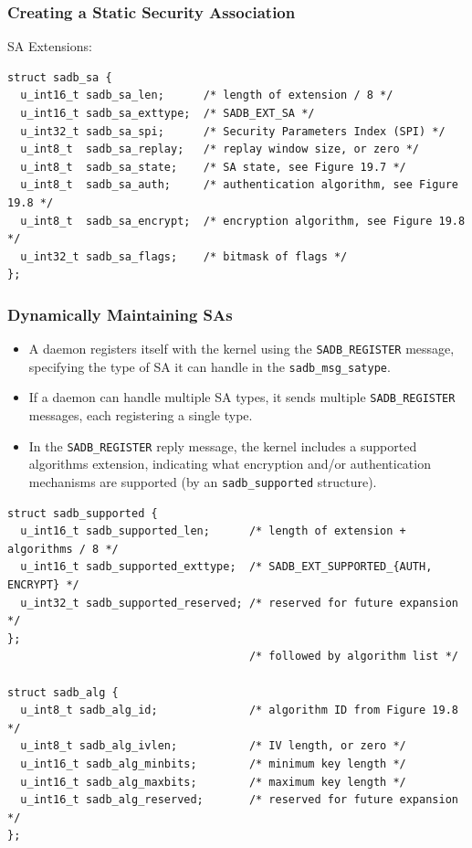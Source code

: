 \documentclass[notes,serif]{beamer}
\begin{document}
\begin{frame}[containsverbatim]
  \frametitle{Creating a Static Security Association}
  SA Extensions:
  {\scriptsize
  \begin{verbatim}
struct sadb_sa {
  u_int16_t sadb_sa_len;      /* length of extension / 8 */
  u_int16_t sadb_sa_exttype;  /* SADB_EXT_SA */
  u_int32_t sadb_sa_spi;      /* Security Parameters Index (SPI) */
  u_int8_t  sadb_sa_replay;   /* replay window size, or zero */
  u_int8_t  sadb_sa_state;    /* SA state, see Figure 19.7 */
  u_int8_t  sadb_sa_auth;     /* authentication algorithm, see Figure 19.8 */
  u_int8_t  sadb_sa_encrypt;  /* encryption algorithm, see Figure 19.8 */
  u_int32_t sadb_sa_flags;    /* bitmask of flags */
};
  \end{verbatim}
  }
\end{frame}

\begin{frame}[containsverbatim]
  \frametitle{Dynamically Maintaining SAs}
  {\scriptsize
  \begin{itemize}
    \item A daemon registers itself with the kernel using the \texttt{SADB\_REGISTER} message, specifying the type of SA it can handle in the \texttt{sadb\_msg\_satype}.
    \item If a daemon can handle multiple SA types, it sends multiple \texttt{SADB\_REGISTER} messages, each registering a single type.
    \item In the \texttt{SADB\_REGISTER} reply message, the kernel includes a supported algorithms extension, indicating what encryption and/or authentication mechanisms are supported (by an \texttt{sadb\_supported} structure).
  \end{itemize}
  }
  {\tiny
  \begin{verbatim}
struct sadb_supported {
  u_int16_t sadb_supported_len;      /* length of extension + algorithms / 8 */
  u_int16_t sadb_supported_exttype;  /* SADB_EXT_SUPPORTED_{AUTH, ENCRYPT} */
  u_int32_t sadb_supported_reserved; /* reserved for future expansion */
};
                                     /* followed by algorithm list */

struct sadb_alg {
  u_int8_t sadb_alg_id;              /* algorithm ID from Figure 19.8 */
  u_int8_t sadb_alg_ivlen;           /* IV length, or zero */
  u_int16_t sadb_alg_minbits;        /* minimum key length */
  u_int16_t sadb_alg_maxbits;        /* maximum key length */
  u_int16_t sadb_alg_reserved;       /* reserved for future expansion */
};
  \end{verbatim}
  }
\end{frame}
\end{document}
